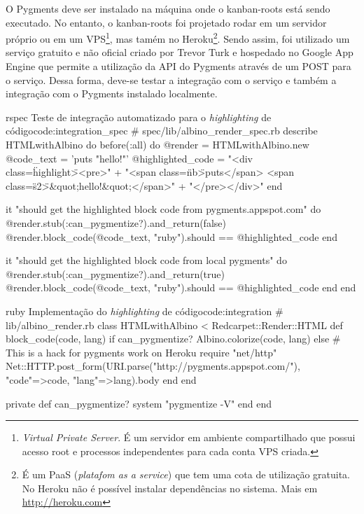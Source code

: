 O Pygments deve ser instalado na máquina onde o kanban-roots está sendo executado. No entanto, o kanban-roots foi projetado rodar em um servidor próprio ou em um VPS\footnote{ \textit{Virtual Private Server}. É um servidor em ambiente compartilhado que possui acesso root e processos independentes para cada conta VPS criada.}, mas tamém no Heroku\footnote{ É um PaaS (\textit{platafom as a service}) que tem uma cota de utilização gratuita. No Heroku não é possível instalar dependências no sistema. Mais em \url{http://heroku.com}}. Sendo assim, foi utilizado um serviço gratuito e não oficial criado por Trevor Turk e hospedado no Google App Engine que permite a utilização da API do Pygments através de um POST para o serviço. Dessa forma, deve-se testar a integração com o serviço e também a integração com o Pygments instalado localmente.

\begin{mycode}{rspec}%
{Teste de integração automatizado para o \textit{highlighting} de código}{code:integration_spec}
# spec/lib/albino_render_spec.rb
describe HTMLwithAlbino do
  before(:all) do
    @render = HTMLwithAlbino.new
    @code_text = 'puts "hello!"'
    @highlighted_code =
      "<div class=\"highlight\"><pre>" +
        "<span class=\"nb\">puts</span> <span class=\"s2\">&quot;hello!&quot;</span>\n" +
      "</pre>\n</div>\n"
  end

  it "should get the highlighted block code from pygments.appspot.com" do
    @render.stub(:can_pygmentize?).and_return(false)
    @render.block_code(@code_text, "ruby").should == @highlighted_code
  end

  it "should get the highlighted block code from local pygments" do
    @render.stub(:can_pygmentize?).and_return(true)
    @render.block_code(@code_text, "ruby").should == @highlighted_code
  end
end
\end{mycode}

\begin{mycode}{ruby}%
{Implementação do \textit{highlighting} de código}{code:integration}
# lib/albino_render.rb
class HTMLwithAlbino < Redcarpet::Render::HTML
  def block_code(code, lang)
    if can_pygmentize?
      Albino.colorize(code, lang)
    else
      # This is a hack for pygments work on Heroku
      require "net/http"
      Net::HTTP.post_form(URI.parse("http://pygments.appspot.com/"),
                          {"code"=>code, "lang"=>lang}).body
    end
  end

  private
  def can_pygmentize?
    system "pygmentize -V"
  end
end
\end{mycode}

